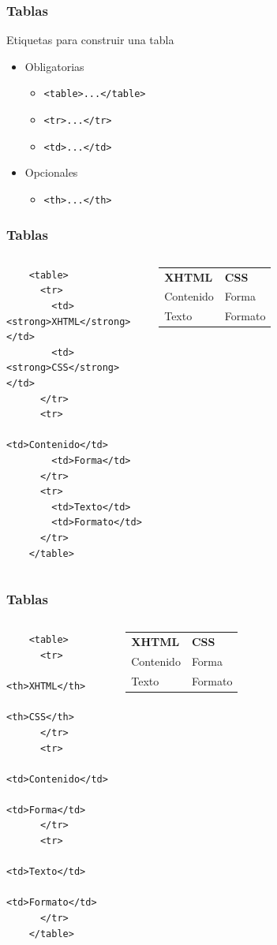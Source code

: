\documentclass{beamer}
\begin{document}
\begin{frame}[fragile]
\frametitle{Tablas}
	Etiquetas para construir una tabla
	\begin{itemize}
	\item Obligatorias
		\begin{itemize}
		\item \verb|<table>...</table>|
		\item \verb|<tr>...</tr>|
		\item \verb|<td>...</td>|
		\end{itemize}
	\item Opcionales
		\begin{itemize}
		\item \verb|<th>...</th>|
		\end{itemize}
	\end{itemize}
\end{frame}

\begin{frame}[fragile]
\frametitle{Tablas}
	\begin{columns}[c]
	\small{
	\begin{verbatim}
	<table>
	  <tr>
	    <td><strong>XHTML</strong></td>
	    <td><strong>CSS</strong></td>
	  </tr>
	  <tr>
	    <td>Contenido</td>
	    <td>Forma</td>
	  </tr>
	  <tr>
	    <td>Texto</td>
	    <td>Formato</td>
	  </tr>
	</table>
	\end{verbatim}
	}
	\begin{tabular}{ll}
	\textbf{XHTML} & \textbf{CSS} \\ 
	Contenido & Forma \\ 
	Texto & Formato \\ 
	\end{tabular} 
	\end{columns}
\end{frame}

\begin{frame}[fragile]
\frametitle{Tablas}
	\begin{columns}[c]
	\small{
	\begin{verbatim}
	<table>
	  <tr>
	    <th>XHTML</th>
	    <th>CSS</th>
	  </tr>
	  <tr>
	    <td>Contenido</td>
	    <td>Forma</td>
	  </tr>
	  <tr>
	    <td>Texto</td>
	    <td>Formato</td>
	  </tr>
	</table>
	\end{verbatim}
	}
	\begin{tabular}{ll}
	\textbf{XHTML} & \textbf{CSS} \\ 
	Contenido & Forma \\ 
	Texto & Formato \\ 
	\end{tabular} 
	\end{columns}
\end{frame}
\end{document}
